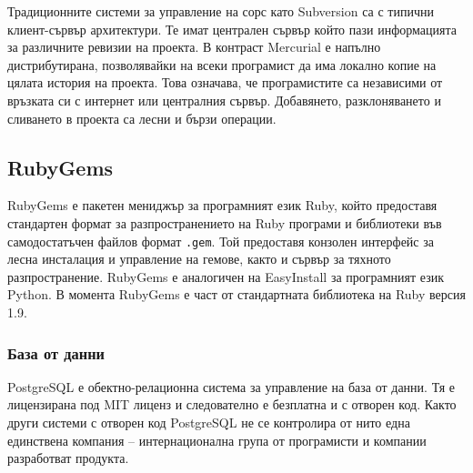 \documentclass[a4paper]{article}
\begin{document}
  Традиционните системи за управление на сорс като Subversion са с типични клиент-сървър архитектури. Те имат централен сървър който пази информацията за различните ревизии на проекта. В контраст Mercurial е напълно дистрибутирана, позволявайки на всеки програмист да има локално копие на цялата история на проекта. Това означава, че програмистите са независими от връзката си с интернет или централния сървър. Добавянето, разклоняването и сливането в проекта са лесни и бързи операции.

  \subsection{RubyGems}
  RubyGems \cite{rubygems} е пакетен мениджър за програмният език Ruby, който предоставя стандартен формат за разпространението на Ruby програми и библиотеки във самодостатъчен файлов формат \texttt{.gem}. Той предоставя конзолен интерфейс за лесна инсталация и управление на гемове, както и сървър за тяхното разпространение. RubyGems е аналогичен на EasyInstall за програмният език Python. В момента RubyGems е част от стандартната библиотека на Ruby версия 1.9.

  \subsubsection{База от данни}
  PostgreSQL \cite{postgresql} е обектно-релационна система за управление на база от данни. Тя е лицензирана под MIT лиценз и следователно е безплатна и с отворен код. Както други системи с отворен код PostgreSQL не се контролира от нито една единствена компания -- интернационална група от програмисти и компании разработват продукта.
\end{document}
